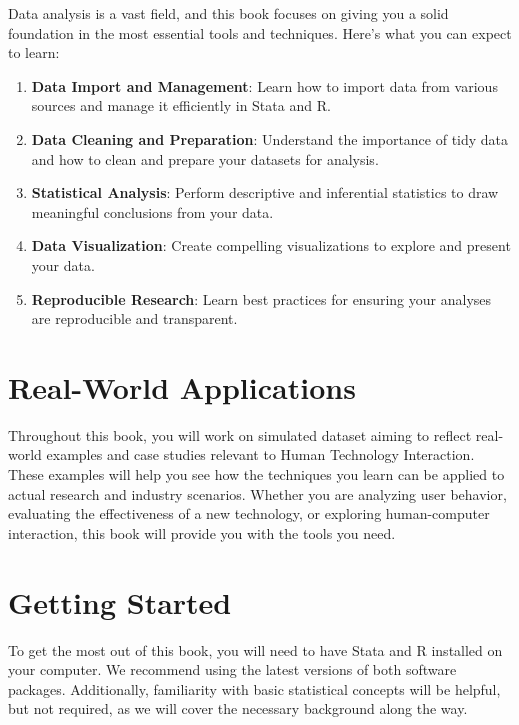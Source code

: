\documentclass[
  letterpaper,
  DIV=11,
  numbers=noendperiod]{scrreprt}
\providecommand{\tightlist}{%
  \setlength{\itemsep}{0pt}\setlength{\parskip}{0pt}}\usepackage{longtable,booktabs,array}
\begin{document}

Data analysis is a vast field, and this book focuses on giving you a
solid foundation in the most essential tools and techniques. Here's what
you can expect to learn:

\begin{enumerate}
\def\labelenumi{\arabic{enumi}.}
\tightlist
\item
  \textbf{Data Import and Management}: Learn how to import data from
  various sources and manage it efficiently in Stata and R.
\item
  \textbf{Data Cleaning and Preparation}: Understand the importance of
  tidy data and how to clean and prepare your datasets for analysis.
\item
  \textbf{Statistical Analysis}: Perform descriptive and inferential
  statistics to draw meaningful conclusions from your data.
\item
  \textbf{Data Visualization}: Create compelling visualizations to
  explore and present your data.
\item
  \textbf{Reproducible Research}: Learn best practices for ensuring your
  analyses are reproducible and transparent.
\end{enumerate}

\section*{Real-World Applications}\label{real-world-applications}


Throughout this book, you will work on simulated dataset aiming to
reflect real-world examples and case studies relevant to Human
Technology Interaction. These examples will help you see how the
techniques you learn can be applied to actual research and industry
scenarios. Whether you are analyzing user behavior, evaluating the
effectiveness of a new technology, or exploring human-computer
interaction, this book will provide you with the tools you need.

\section*{Getting Started}\label{getting-started}


To get the most out of this book, you will need to have Stata and R
installed on your computer. We recommend using the latest versions of
both software packages. Additionally, familiarity with basic statistical
concepts will be helpful, but not required, as we will cover the
necessary background along the way.
\end{document}
